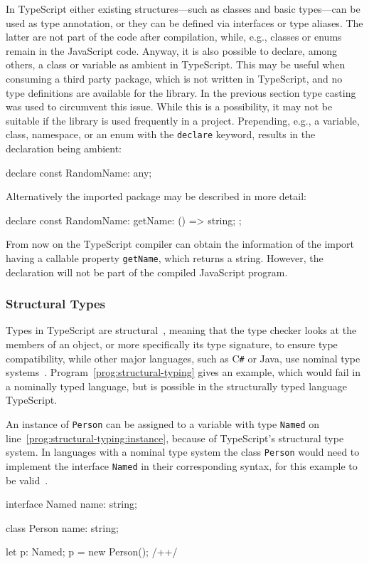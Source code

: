 In TypeScript either existing structures---such as classes and basic types---can be used as type annotation, or they can be defined via interfaces or type aliases. The latter are not part of the code after compilation, while, e.g., classes or enums remain in the JavaScript code. Anyway, it is also possible to declare, among others, a class or variable as ambient in TypeScript. This may be useful when consuming a third party package, which is not written in TypeScript, and no type definitions are available for the library. In the previous section type casting was used to circumvent this issue. While this is a possibility, it may not be suitable if the library is used frequently in a project. Prepending, e.g., a variable, class, namespace, or an enum with the \texttt{declare} keyword, results in the declaration being ambient:
\begin{JsCode}[numbers=none]
declare const RandomName: any;
\end{JsCode}
Alternatively the imported package may be described in more detail:
\begin{JsCode}[numbers=none]
declare const RandomName: {
  getName: () => string;
};
\end{JsCode}
From now on the TypeScript compiler can obtain the information of the import having a callable property \texttt{getName}, which returns a string. However, the declaration will not be part of the compiled JavaScript program.

\subsubsection{Structural Types}

Types in TypeScript are structural~\cite[p.~11]{TypeScriptBook:Syed:2017}, meaning that the type checker looks at the members of an object, or more specifically its type signature, to ensure type compatibility, while other major languages, such as C\texttt{\#} or Java, use nominal type systems~\cite{TypeScriptHandbook:TypeCompatibility}. Program~\ref{prog:structural-typing} gives an example, which would fail in a nominally typed language, but is possible in the structurally typed language TypeScript.

\begin{program}
\caption{An instance of \texttt{Person} can be assigned to a variable with type \texttt{Named} on line~\ref{prog:structural-typing:instance}, because of TypeScript's structural type system. In languages with a nominal type system the class \texttt{Person} would need to implement the interface \texttt{Named} in their corresponding syntax, for this example to be valid~\cite{TypeScriptHandbook:TypeCompatibility}.}
\label{prog:structural-typing}
\begin{JsCode}
interface Named {
    name: string;
}

class Person {
    name: string;
}

let p: Named;
p = new Person(); /+\label{prog:structural-typing:instance}+/
\end{JsCode}
\end{program}

